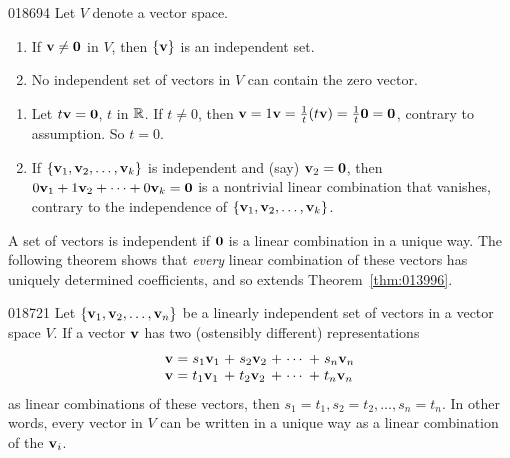 \begin{example}{}{018694}
Let $V$ denote a vector space.

\begin{enumerate}
\item If $\textbf{v} \neq \textbf{0}$ in $V$, then $\{\textbf{v}\}$ is an independent set.

\item No independent set of vectors in $V$ can contain the zero vector.

\end{enumerate}

\begin{solution}
\begin{enumerate}
\item Let $t\textbf{v} = \textbf{0}$, $t$ in $\mathbb{R}$. If $t \neq 0$, then $\textbf{v} = 1\textbf{v} = \tfrac{1}{t}(t\textbf{v}) = \tfrac{1}{t}\textbf{0} = \textbf{0}$, contrary to assumption. So $t = 0$.

\item If $\{\textbf{v}_{1}, \textbf{v}_{2}, \dots, \textbf{v}_{k}\}$ is independent and (say) $\textbf{v}_{2} = \textbf{0}$, then $0\textbf{v}_{1} + 1\textbf{v}_{2} + \dots + 0\textbf{v}_{k} = \textbf{0}$ is a nontrivial linear combination that vanishes, contrary to the independence of $\{\textbf{v}_{1}, \textbf{v}_{2}, \dots, \textbf{v}_{k}\}$.
\end{enumerate}
\end{solution}
\end{example}

A set of vectors is independent if $\textbf{0}$ is a linear combination in a unique way. The following theorem shows that \textit{every} linear combination of these vectors has uniquely determined coefficients, and so extends Theorem~\ref{thm:013996}.

\begin{theorem}{}{018721}
Let $\{\textbf{v}_{1}, \textbf{v}_{2}, \dots, \textbf{v}_{n}\}$ be a linearly independent set of vectors in a vector space $V$. If a vector $\textbf{v}$ has two (ostensibly different) representations
\begin{equation*}\def\arraycolsep{1.5pt}
\begin{array}{lllllllll}
\vect{v} & = & s_1\vect{v}_1 &+& s_2\vect{v}_2 &+& \cdots &+& s_n\vect{v}_n \\
\vect{v} & = & t_1\vect{v}_1 &+& t_2\vect{v}_2 &+& \cdots &+& t_n\vect{v}_n
\end{array}
\end{equation*}
as linear combinations of these vectors, then $s_{1} = t_{1}, s_{2} = t_{2}, \dots, s_{n} = t_{n}$. In other words, every vector in $V$ can be written in a unique way as a linear combination of the $\textbf{v}_{i}$.
\end{theorem}

